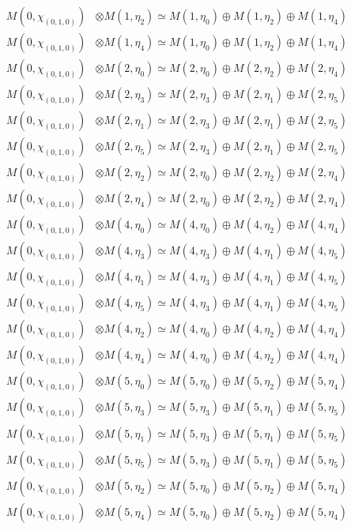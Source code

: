 \begin{align*}
M(0,\chi_{(0,1,0)}) &\otimes M(1,\eta_{2}) \simeq M(1,\eta_{0}) \oplus M(1,\eta_{2}) \oplus M(1,\eta_{4})\\
M(0,\chi_{(0,1,0)}) &\otimes M(1,\eta_{4}) \simeq M(1,\eta_{0}) \oplus M(1,\eta_{2}) \oplus M(1,\eta_{4})\\
M(0,\chi_{(0,1,0)}) &\otimes M(2,\eta_{0}) \simeq M(2,\eta_{0}) \oplus M(2,\eta_{2}) \oplus M(2,\eta_{4})\\
M(0,\chi_{(0,1,0)}) &\otimes M(2,\eta_{3}) \simeq M(2,\eta_{3}) \oplus M(2,\eta_{1}) \oplus M(2,\eta_{5})\\
M(0,\chi_{(0,1,0)}) &\otimes M(2,\eta_{1}) \simeq M(2,\eta_{3}) \oplus M(2,\eta_{1}) \oplus M(2,\eta_{5})\\
M(0,\chi_{(0,1,0)}) &\otimes M(2,\eta_{5}) \simeq M(2,\eta_{3}) \oplus M(2,\eta_{1}) \oplus M(2,\eta_{5})\\
M(0,\chi_{(0,1,0)}) &\otimes M(2,\eta_{2}) \simeq M(2,\eta_{0}) \oplus M(2,\eta_{2}) \oplus M(2,\eta_{4})\\
M(0,\chi_{(0,1,0)}) &\otimes M(2,\eta_{4}) \simeq M(2,\eta_{0}) \oplus M(2,\eta_{2}) \oplus M(2,\eta_{4})\\
M(0,\chi_{(0,1,0)}) &\otimes M(4,\eta_{0}) \simeq M(4,\eta_{0}) \oplus M(4,\eta_{2}) \oplus M(4,\eta_{4})\\
M(0,\chi_{(0,1,0)}) &\otimes M(4,\eta_{3}) \simeq M(4,\eta_{3}) \oplus M(4,\eta_{1}) \oplus M(4,\eta_{5})\\
M(0,\chi_{(0,1,0)}) &\otimes M(4,\eta_{1}) \simeq M(4,\eta_{3}) \oplus M(4,\eta_{1}) \oplus M(4,\eta_{5})\\
M(0,\chi_{(0,1,0)}) &\otimes M(4,\eta_{5}) \simeq M(4,\eta_{3}) \oplus M(4,\eta_{1}) \oplus M(4,\eta_{5})\\
M(0,\chi_{(0,1,0)}) &\otimes M(4,\eta_{2}) \simeq M(4,\eta_{0}) \oplus M(4,\eta_{2}) \oplus M(4,\eta_{4})\\
M(0,\chi_{(0,1,0)}) &\otimes M(4,\eta_{4}) \simeq M(4,\eta_{0}) \oplus M(4,\eta_{2}) \oplus M(4,\eta_{4})\\
M(0,\chi_{(0,1,0)}) &\otimes M(5,\eta_{0}) \simeq M(5,\eta_{0}) \oplus M(5,\eta_{2}) \oplus M(5,\eta_{4})\\
M(0,\chi_{(0,1,0)}) &\otimes M(5,\eta_{3}) \simeq M(5,\eta_{3}) \oplus M(5,\eta_{1}) \oplus M(5,\eta_{5})\\
M(0,\chi_{(0,1,0)}) &\otimes M(5,\eta_{1}) \simeq M(5,\eta_{3}) \oplus M(5,\eta_{1}) \oplus M(5,\eta_{5})\\
M(0,\chi_{(0,1,0)}) &\otimes M(5,\eta_{5}) \simeq M(5,\eta_{3}) \oplus M(5,\eta_{1}) \oplus M(5,\eta_{5})\\
M(0,\chi_{(0,1,0)}) &\otimes M(5,\eta_{2}) \simeq M(5,\eta_{0}) \oplus M(5,\eta_{2}) \oplus M(5,\eta_{4})\\
M(0,\chi_{(0,1,0)}) &\otimes M(5,\eta_{4}) \simeq M(5,\eta_{0}) \oplus M(5,\eta_{2}) \oplus M(5,\eta_{4})\\
\end{align*}

